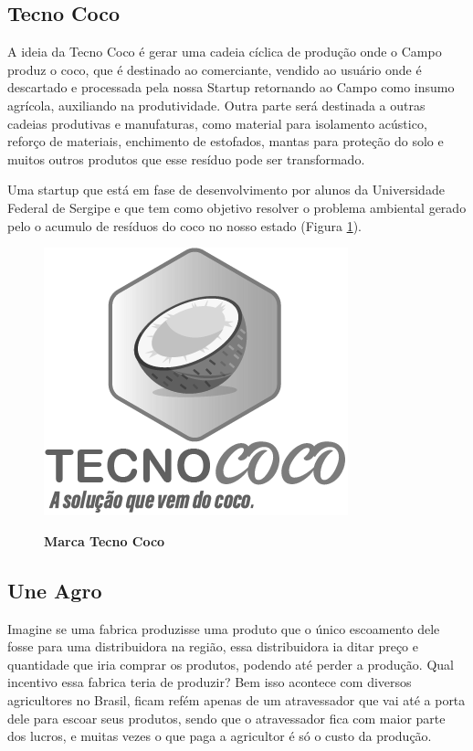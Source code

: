 \subsection{Tecno Coco}

A ideia da Tecno Coco é gerar uma cadeia cíclica de produção onde o Campo produz o coco, que é destinado ao comerciante, vendido ao usuário onde é descartado e processada pela nossa Startup retornando ao Campo como insumo agrícola, auxiliando na produtividade. Outra parte será destinada a outras cadeias produtivas e manufaturas, como material para isolamento acústico, reforço de materiais, enchimento de estofados, mantas para proteção do solo e muitos outros produtos que esse resíduo pode ser transformado.

Uma startup que está em fase de desenvolvimento por alunos da Universidade Federal de Sergipe e que tem como objetivo resolver o problema ambiental gerado pelo o acumulo de resíduos do coco no nosso estado (Figura \ref{figura_27}).

\begin{figure}[H]
\centering
\caption{\textbf{Marca Tecno Coco}}
\includegraphics[scale=2.0]{Imagens/tecnococo.png}
\label{figura_27}
\end{figure}



\subsection{Une Agro}

Imagine se uma fabrica produzisse uma produto que o único escoamento dele fosse para uma distribuidora na região, essa distribuidora ia ditar preço e quantidade que iria comprar os produtos, podendo até perder a produção. Qual incentivo essa fabrica teria de produzir? Bem isso acontece com diversos agricultores no Brasil, ficam refém apenas de um atravessador que vai até a porta dele para escoar seus produtos, sendo que o atravessador fica com maior parte dos lucros, e muitas vezes o que paga a agricultor é só o custo da produção.

